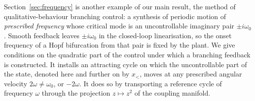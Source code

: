 \documentclass[11pt,reqno]{amsart}
\theoremstyle{plain}
\theoremstyle{definition}
\theoremstyle{remark}
\begin{document}
Section~\ref{sec:frequency} is another example of our main result, the method of qualitative-behaviour
branching control: a
synthesis of periodic motion of \emph{prescribed frequency} whose critical mode is an
uncontrollable imaginary pair $\pm i\omega_0$. Smooth feedback leaves $\pm i\omega_0$ in the
closed-loop linearisation, so the onset frequency of a Hopf bifurcation from that pair is fixed by
the plant. We give conditions on the quadratic part of the control under which a branching feedback is
constructed. It installs an attracting cycle on which the uncontrollable part of the state, denoted here and further on by $x_<$, moves at any prescribed angular
velocity $2\omega\neq\omega_0$, or $-2\omega$. It does so by transporting a reference cycle of frequency
$\omega$ through the projection $z\mapsto z^{2}$ of the coupling manifold.
\end{document}
